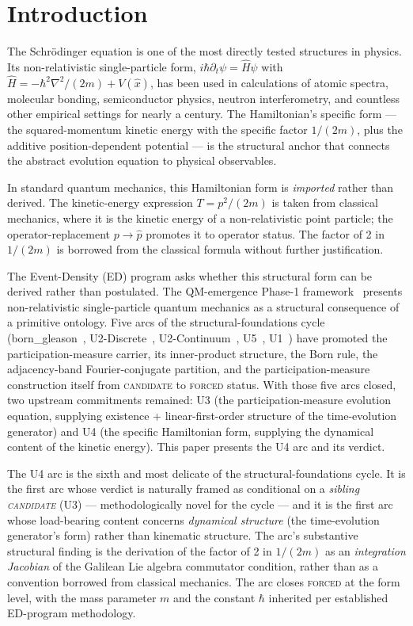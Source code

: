 \documentclass[11pt,a4paper]{article}
\begin{document}
\section{Introduction}

The Schr\"odinger equation is one of the most directly tested structures in physics. Its non-relativistic single-particle form, $i\hbar \partial_t \psi = \hat{H} \psi$ with $\hat{H} = -\hbar^2 \nabla^2 / (2m) + V(\hat{x})$, has been used in calculations of atomic spectra, molecular bonding, semiconductor physics, neutron interferometry, and countless other empirical settings for nearly a century. The Hamiltonian's specific form --- the squared-momentum kinetic energy with the specific factor $1/(2m)$, plus the additive position-dependent potential --- is the structural anchor that connects the abstract evolution equation to physical observables.

In standard quantum mechanics, this Hamiltonian form is \emph{imported} rather than derived. The kinetic-energy expression $T = p^2/(2m)$ is taken from classical mechanics, where it is the kinetic energy of a non-relativistic point particle; the operator-replacement $p \to \hat{p}$ promotes it to operator status. The factor of 2 in $1/(2m)$ is borrowed from the classical formula without further justification.

The Event-Density (ED) program asks whether this structural form can be derived rather than postulated. The QM-emergence Phase-1 framework~\cite{phase1} presents non-relativistic single-particle quantum mechanics as a structural consequence of a primitive ontology. Five arcs of the structural-foundations cycle (born\_gleason~\cite{borngleason}, U2-Discrete~\cite{u2}, U2-Continuum~\cite{u2}, U5~\cite{u5}, U1~\cite{u1}) have promoted the participation-measure carrier, its inner-product structure, the Born rule, the adjacency-band Fourier-conjugate partition, and the participation-measure construction itself from \textsc{candidate} to \textsc{forced} status. With those five arcs closed, two upstream commitments remained: U3 (the participation-measure evolution equation, supplying existence + linear-first-order structure of the time-evolution generator) and U4 (the specific Hamiltonian form, supplying the dynamical content of the kinetic energy). This paper presents the U4 arc and its verdict.

The U4 arc is the sixth and most delicate of the structural-foundations cycle. It is the first arc whose verdict is naturally framed as conditional on a \emph{sibling \textsc{candidate}} (U3) --- methodologically novel for the cycle --- and it is the first arc whose load-bearing content concerns \emph{dynamical structure} (the time-evolution generator's form) rather than kinematic structure. The arc's substantive structural finding is the derivation of the factor of 2 in $1/(2m)$ as an \emph{integration Jacobian} of the Galilean Lie algebra commutator condition, rather than as a convention borrowed from classical mechanics. The arc closes \textsc{forced} at the form level, with the mass parameter $m$ and the constant $\hbar$ inherited per established ED-program methodology.
\end{document}
